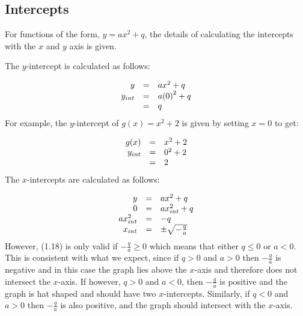 \subsection*{ Intercepts}
\nopagebreak
For functions of the form, $y=a{x}^{2}+q$, the details of calculating the intercepts with the $x$ and $y$ axis is given.\par 
The $y$-intercept is calculated as follows:\par 
\nopagebreak\noindent{}
\begin{equation*}
\begin{array}{ccc}\hfill y& =& a{x}^{2}+q\hfill \\ \hfill {y}_{int}& =& a{(0)}^{2}+q\hfill \\ & =& q\hfill \end{array}
\end{equation*}
For example, the $y$-intercept of $g(x)={x}^{2}+2$ is given by setting $x=0$ to get:\par 
\nopagebreak\noindent{}
\begin{equation*}
\begin{array}{ccc}\hfill g(x)& =& {x}^{2}+2\hfill \\ \hfill {y}_{int}& =& {0}^{2}+2\hfill \\ & =& 2\hfill \end{array}
\end{equation*}
The $x$-intercepts are calculated as follows:\par 
\nopagebreak\noindent{}
\begin{equation*}
\begin{array}{ccc}\hfill y& =& a{x}^{2}+q\hfill \\ \hfill 0& =& ax_{int}^{2}+q\hfill \\ \hfill ax_{int}^{2}& =& -q\hfill \\ \hfill {x}_{int}& =& \ensuremath{\pm}\sqrt{-\frac{q}{a}}\hfill \end{array}
\end{equation*}
However, (1.18) is only valid if $-\frac{q}{a}\ge 0$ which means that either $q\le 0$ or $a<0$. This is consistent with what we expect, since if $q>0$ and $a>0$ then $-\frac{q}{a}$ is negative and in this case the graph lies above the $x$-axis and therefore does not intersect the $x$-axis. If however, $q>0$ and $a<0$, then $-\frac{q}{a}$ is positive and the graph is hat shaped and should have two $x$-intercepts. Similarly, if $q<0$ and $a>0$ then $-\frac{q}{a}$ is also positive, and the graph should intersect with the $x$-axis.\par 

